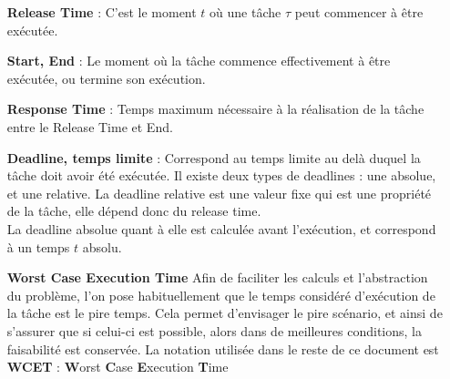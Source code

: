 \documentclass[11pt,a4paper,oneside]{report}
\begin{document}
\begin{itemize}
	\item[\textbf{Release Time}] : C'est le moment $t$ où une tâche $\tau$ peut commencer à être exécutée.
	\item[\textbf{Start, End}] : Le moment où la tâche commence effectivement à être exécutée, ou termine son exécution.
	\item[\textbf{Response Time\label{Response Time}}] : Temps maximum nécessaire à la réalisation de la tâche 
	entre le Release Time et End. %
	\item[\textbf{Deadline, temps limite}] : Correspond au temps limite au delà duquel la tâche doit avoir été exécutée. Il existe deux types de deadlines : 
	une absolue, et une relative. La deadline relative est une valeur fixe qui 
	est une propriété de la tâche, elle dépend donc du release time.\\
	La deadline absolue quant à elle est calculée avant l'exécution, et correspond 
	à un temps $t$ absolu.%
	
	\item[\textbf{Worst Case Execution Time}] Afin de faciliter les calculs et l'abstraction du problème, l'on pose habituellement que le temps considéré d'exécution de 
	la tâche est le pire temps. Cela permet d'envisager le pire scénario, et ainsi 
	de s'assurer que si celui-ci est possible, alors dans de meilleures conditions, 
	la faisabilité est conservée. La notation utilisée dans le reste de ce document 
	est  \textbf{WCET} : \textbf{W}orst \textbf{C}ase \textbf{E}xecution \textbf{T}ime
	

\end{itemize}
\end{document}
